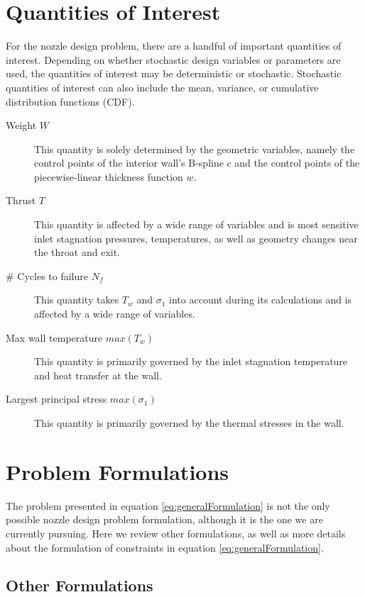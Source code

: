 \documentclass{article}
\begin{document}
\section{Quantities of Interest}

For the nozzle design problem, there are a handful of important quantities of interest. Depending on whether stochastic design variables or parameters are used, the quantities of interest may be deterministic or stochastic. Stochastic quantities of interest can also include the mean, variance, or cumulative distribution functions (CDF).

\begin{description}
\item[Weight $W$] This quantity is solely determined by the geometric variables, namely the control points of the interior wall's B-spline $c$ and the control points of the piecewise-linear thickness function $w$.
\item[Thrust $T$] This quantity is affected by a wide range of variables and is most sensitive inlet stagnation pressures, temperatures, as well as geometry changes near the throat and exit.
\item[\# Cycles to failure $N_f$] This quantity takes $T_w$ and $\sigma_1$ into account during its calculations and is affected by a wide range of variables.
\item[Max wall temperature $max( T_w )$] This quantity is primarily governed by the inlet stagnation temperature and heat transfer at the wall.
\item[Largest principal stress $max( \sigma_1 )$] This quantity is primarily governed by the thermal stresses in the wall.
\end{description}

\section{Problem Formulations}

The problem presented in equation \ref{eq:generalFormulation} is not the only possible nozzle design problem formulation, although it is the one we are currently pursuing. Here we review other formulations, as well as more details about the formulation of constraints in equation \ref{eq:generalFormulation}.

\subsection{Other Formulations}
\end{document}

